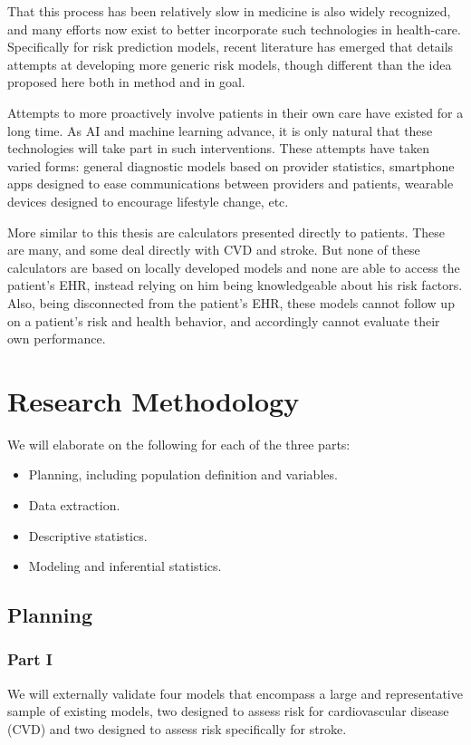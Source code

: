\documentclass[a4paper,12pt]{article}
\begin{document}
	That this process has been relatively slow in medicine is also widely recognized, and many efforts now exist to better incorporate such technologies in health-care\cite{Obermeyer2016}. Specifically for risk prediction models, recent literature has emerged that details attempts at developing more generic risk models, though different than the idea proposed here both in method and in goal\cite{Rajkomar2018}.
	
	Attempts to more proactively involve patients in their own care have existed for a long time\cite{MedicineUSCommitteeonQualityofHealthCareinAmerica2001}. As AI and machine learning advance, it is only natural that these technologies will take part in such interventions. These attempts have taken varied forms: general diagnostic models based on provider statistics\cite{Aurbach2018}, smartphone apps designed to ease communications between providers and patients\cite{Sundberg2017}, wearable devices designed to encourage lifestyle change\cite{Gordon2017}, etc.
	
	More similar to this thesis are calculators presented directly to patients. These are many, and some deal directly with CVD and stroke\cite{Parmar2015}. But none of these calculators are based on locally developed models and none are able to access the patient's EHR, instead relying on him being knowledgeable about his risk factors. Also, being disconnected from the patient's EHR, these models cannot follow up on a patient's risk and health behavior, and accordingly cannot evaluate their own performance.
	
	\section{Research Methodology}
	We will elaborate on the following for each of the three parts:
	\begin{itemize}
		\item Planning, including population definition and variables.
		\item Data extraction.
		\item Descriptive statistics.
		\item Modeling and inferential statistics.
	\end{itemize}

	\subsection{Planning}
	
		\subsubsection{Part I}
		We will externally validate four models that encompass a large and representative sample of existing models, two designed to assess risk for cardiovascular disease (CVD) and two designed to assess risk specifically for stroke.
		
\end{document}
